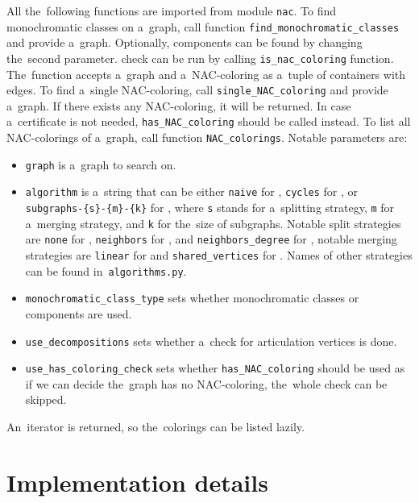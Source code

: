 All the~following functions are imported from module \texttt{nac}.
To find monochromatic classes on a~graph,
call function \texttt{find\_monochromatic\_classes} and provide a~graph.
Optionally, \trcon{} components can be found by changing the~second parameter.
%
\IsNACColoring{} check can be run by calling \texttt{is\_nac\_coloring} function.
The~function accepts a~graph and a~NAC-coloring
as a~tuple of containers with edges.
%
To find a~single NAC-coloring, call \texttt{single\_NAC\_coloring} and provide
a~graph. If there exists any NAC-coloring, it will be returned.
In case a~certificate is not needed,
\texttt{has\_NAC\_coloring} should be called instead.
%
To list all NAC-colorings of a~graph, call function \texttt{NAC\_colorings}.
Notable parameters are:
\begin{itemize}
	\item \texttt{graph} is a~graph to search on.
	\item \texttt{algorithm} is a~string that can be either
	      \texttt{naive} for \Naive{},
	      \texttt{cycles} for \NaiveCycles{},
	      or \texttt{subgraphs-\{s\}-\{m\}-\{k\}} for \Subgraphs{},
	      where \texttt{s} stands for a~splitting strategy,
	      \texttt{m} for a~merging strategy,
	      and \texttt{k} for the~size of subgraphs.
	      Notable split strategies are
	      \texttt{none} for \None{},
	      \texttt{neighbors} for \Neighbors{}, and
	      \texttt{neighbors\_degree} for \NeighborsDegree{},
	      notable merging strategies are
	      \texttt{linear} for \MergeLinear{} and
	      \texttt{shared\_vertices} for \SharedVertices{}.
	      Names of other strategies can be found in~\texttt{algorithms.py}.
	\item \texttt{monochromatic\_class\_type} sets
	      whether monochromatic classes or \trcon{} components are used.
	\item \texttt{use\_decompositions} sets
	      whether a~check for articulation vertices is done.
	\item \texttt{use\_has\_coloring\_check} sets
	      whether \texttt{has\_NAC\_coloring} should be used
	      as if we can decide the~graph has no NAC-coloring,
	      the~whole check can be skipped.
\end{itemize}
%
An~iterator is returned, so the~colorings can be listed lazily.


\section{Implementation details}


